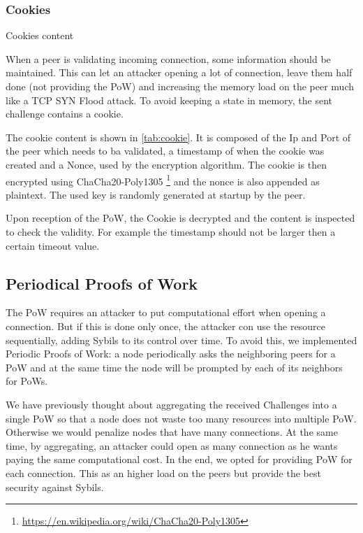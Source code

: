 \documentclass[a4paper,english,10pt,NET]{tumarticle}
\begin{document}
\subsubsection{Cookies}

\begin{table}
	\centering
	
	\caption{Cookies content}
	\label{tab:cookie}
\end{table}

When a peer is validating incoming connection, some information should be maintained. This can let an attacker opening a lot of connection, leave them half done (not providing the PoW) and increasing the memory load on the peer much like a TCP SYN Flood attack. To avoid keeping a state in memory, the sent challenge contains a cookie. 

The cookie content is shown in \cref{tab:cookie}. It is composed of the Ip and Port of the peer which needs to ba validated, a timestamp of when the cookie was created and a Nonce, used by the encryption algorithm. The cookie is then encrypted using ChaCha20-Poly1305 \footnote{\url{https://en.wikipedia.org/wiki/ChaCha20-Poly1305}} and the nonce is also appended as plaintext. The used key is randomly generated at startup by the peer.

Upon reception of the PoW, the Cookie is decrypted and the content is inspected to check the validity. For example the timestamp should not be larger then a certain timeout value.

\subsection{Periodical Proofs of Work}

The PoW requires an attacker to put computational effort when opening a connection. But if this is done only once, the attacker con use the resource sequentially, adding Sybils to its control over time. To avoid this, we implemented Periodic Proofs of Work: a node periodically asks the neighboring peers for a PoW and at the same time the node will be prompted by each of its neighbors for PoWs. 

We have previously thought about aggregating the received Challenges into a single PoW so that a node does not waste too many resources into multiple PoW. Otherwise we would penalize nodes that have many connections. At the same time, by aggregating, an attacker could open as many connection as he wants paying the same computational cost. In the end, we opted for providing PoW for each connection. This as an higher load on the peers but provide the best security against Sybils.
\end{document}
